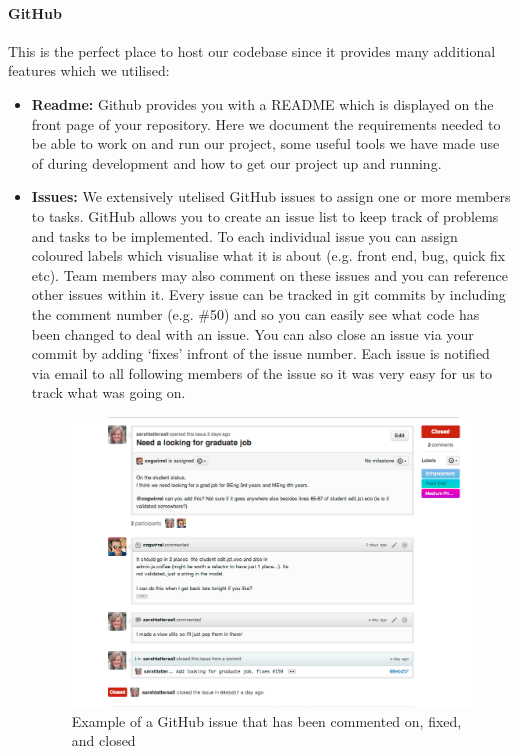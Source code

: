     \paragraph{GitHub\cite{github}} This is the perfect place to host our codebase since it provides many additional features which we utilised:
    \begin{itemize}
        \item \textbf{Readme:} Github provides you with a README which is displayed on the front page of your repository. Here we document the requirements needed to be able to work on and run our project, some useful tools we have made use of during development and how to get our project up and running.
        \item \textbf{Issues:} We extensively utelised GitHub issues to assign one or more members to tasks. GitHub allows you to create an issue list to keep track of problems and tasks to be implemented. To each individual issue you can assign coloured labels which visualise what it is about (e.g. front end, bug, quick fix etc). Team members may also comment on these issues and you can reference other issues within it. Every issue can be tracked in git commits by including the comment number (e.g. \#50) and so you can easily see what code has been changed to deal with an issue. You can also close an issue via your commit by adding `fixes' infront of the issue number. Each issue is notified via email to all following members of the issue so it was very easy for us to track what was going on.

        \begin{figure}[H]\centering
        \includegraphics[scale=0.3]{images/project_management/team_management/graduate_issue}
        \caption{Example of a GitHub issue that has been commented on, fixed, and closed}


\end{figure}
\end{itemize}
